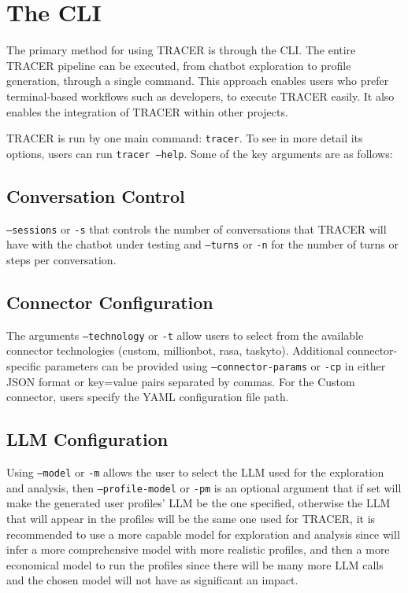 \section{The \acl{CLI}}

The primary method for using \ac{TRACER} is through the \ac{CLI}.
The entire \ac{TRACER} pipeline can be executed,
from chatbot exploration to profile generation,
through a single command.
This approach enables users who prefer terminal-based workflows
such as developers, to execute TRACER easily.
It also enables the integration of \ac{TRACER} within other projects.

\ac{TRACER} is run by one main command: \texttt{tracer}.
To see in more detail its options, users can run \texttt{tracer --help}.
Some of the key arguments are as follows:

\subsection{Conversation Control}

\texttt{--sessions} or \texttt{-s} that controls the number of conversations
that \ac{TRACER} will have with the chatbot under testing
and \texttt{--turns} or \texttt{-n} for the number of turns or steps per conversation.

\subsection{Connector Configuration}

The arguments \texttt{--technology} or \texttt{-t} allow users to select
from the available connector technologies (custom, millionbot, rasa, taskyto).
Additional connector-specific parameters can be provided using
\texttt{--connector-params} or \texttt{-cp} in either \ac{JSON} format or key=value pairs
separated by commas.
For the Custom connector, users specify the YAML configuration file path.

\subsection{LLM Configuration}

Using \texttt{--model} or \texttt{-m} allows the user to select the \acl{LLM}
used for the exploration and analysis,
then \texttt{--profile-model} or \texttt{-pm} is an optional argument
that if set will make the generated user profiles' \ac{LLM} be the one specified,
otherwise the \ac{LLM} that will appear in the profiles
will be the same one used for \ac{TRACER},
it is recommended to use a more capable model for exploration and analysis
since will infer a more comprehensive model with more realistic profiles,
and then a more economical model to run the profiles
since there will be many more \ac{LLM} calls
and the chosen model will not have as significant an impact.

